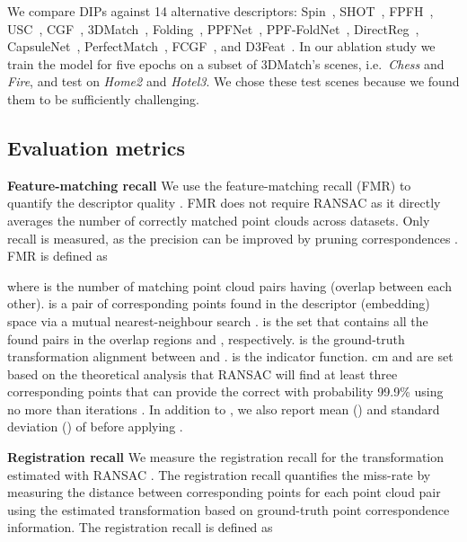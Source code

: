 \documentclass[a4paper,conference]{IEEEtran}
\begin{document}
We compare DIPs against 14 alternative descriptors: Spin~\cite{Johnson1999}, SHOT~\cite{Salti2014}, FPFH~\cite{Rusu2009}, USC~\cite{Tombari2010}, CGF~\cite{Khoury2017}, 3DMatch~\cite{Zeng2017}, Folding~\cite{Yang2017}, PPFNet~\cite{Deng2018cvpr}, PPF-FoldNet~\cite{Deng2018eccv}, DirectReg~\cite{Deng2019}, CapsuleNet~\cite{Zhao2019}, PerfectMatch~\cite{Gojcic2019}, FCGF~\cite{Choy2019}, and D3Feat~\cite{Bai2020}.
In our ablation study we train the model for five epochs on a subset of 3DMatch's scenes, i.e.~\emph{Chess} and \emph{Fire}, and test on \emph{Home2} and \emph{Hotel3}.
We chose these test scenes because we found them to be sufficiently challenging.




\subsection{Evaluation metrics}

\noindent \textbf{Feature-matching recall}
We use the feature-matching recall (FMR) to quantify the descriptor quality \cite{Deng2018cvpr}.
FMR does not require RANSAC \cite{Fischler1981} as it directly averages the number of correctly matched point clouds across datasets. 
Only recall is measured, as the precision can be improved by pruning correspondences \cite{Choi2015,Deng2018cvpr}.
FMR is defined as

where  is the number of matching point cloud pairs having  (overlap between each other).
 is a pair of corresponding points found in the descriptor (embedding) space via a mutual nearest-neighbour search \cite{Gojcic2019}.
 is the set that contains all the found pairs  in the overlap regions  and , respectively.
 is the ground-truth transformation alignment between  and .
 is the indicator function.
cm and  are set based on the theoretical analysis that RANSAC will find at least three corresponding points that can provide the correct  with probability 99.9\% using no more than  iterations \cite{Deng2018cvpr,Gojcic2019}.
In addition to , we also report mean () and standard deviation () of  before applying .





\vspace{1mm}
\noindent \textbf{Registration recall}
We measure the registration recall for the transformation estimated with RANSAC \cite{Choy2019}.
The registration recall quantifies the miss-rate by measuring the distance between corresponding points for each point cloud pair using the estimated transformation based on ground-truth point correspondence information.
The registration recall is defined as
\end{document}
